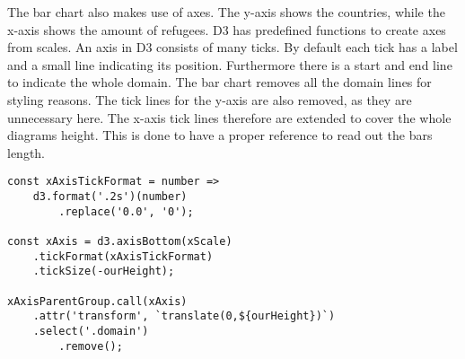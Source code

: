 The bar chart also makes use of axes. The y-axis shows the countries, while the x-axis shows the amount of refugees. D3 has predefined functions to create axes from scales. An axis in D3 consists of many ticks. By default each tick has a label and a small line indicating its position. Furthermore there is a start and end line to indicate the whole domain. The bar chart removes all the domain lines for styling reasons. The tick lines for the y-axis are also removed, as they are unnecessary here. The x-axis tick lines therefore are extended to cover the whole diagrams height. This is done to have a proper reference to read out the bars length.

\begin{minipage}{0.9\linewidth}
    \begin{lstlisting}[style=htmlCSSjs, captionpos=b, caption={The x axis implementation of the bar chart. The first constant defines the tick format. For each number there should be two significant digits. As the zero value is represented as "0.0" to match the previous rule of two significant digits, it is simply replaced by "0". The second constant defines the function creating the axis. The previous tick format is passed here. Furthermore the \texttt{tickSize} is set to the hight of the diagram. This way the initially small tick lines now cover the whole height of the diagram and allow for easier and more accurate readouts. Finally the \texttt{xAxisParentGroup} element, which is part of ther permantent hierarchical structure of the bar chart, calls the \texttt{xAxis} function. This adds the Axis to the diagram. As a last step the domain lines are selected and removed for styling reasons. (Section from \ref{app:bar-chart} lines 60ff)}, label={lst:bar-chart-axes}]
const xAxisTickFormat = number =>
    d3.format('.2s')(number)
        .replace('0.0', '0');

const xAxis = d3.axisBottom(xScale)
    .tickFormat(xAxisTickFormat)
    .tickSize(-ourHeight);

xAxisParentGroup.call(xAxis)
    .attr('transform', `translate(0,${ourHeight})`)
    .select('.domain')
        .remove();
    \end{lstlisting}
\end{minipage}

